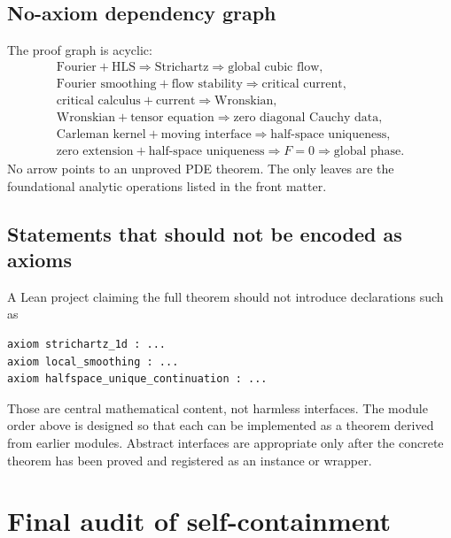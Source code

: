 \documentclass[11pt,oneside]{book}
\theoremstyle{definition}
\theoremstyle{remark}
\newcommand{\1}{\mathbf 1}
\begin{document}
\section{No-axiom dependency graph}
The proof graph is acyclic:
\[
\begin{gathered}
 \text{Fourier}+\text{HLS}
 \Longrightarrow \text{Strichartz}
 \Longrightarrow \text{global cubic flow},\\
 \text{Fourier smoothing}+\text{flow stability}
 \Longrightarrow \text{critical current},\\
 \text{critical calculus}+\text{current}
 \Longrightarrow \text{Wronskian},\\
 \text{Wronskian}+\text{tensor equation}
 \Longrightarrow \text{zero diagonal Cauchy data},\\
 \text{Carleman kernel}+\text{moving interface}
 \Longrightarrow \text{half-space uniqueness},\\
 \text{zero extension}+\text{half-space uniqueness}
 \Longrightarrow F=0
 \Longrightarrow \text{global phase}.
\end{gathered}
\]
No arrow points to an unproved PDE theorem.  The only leaves are the
foundational analytic operations listed in the front matter.

\section{Statements that should not be encoded as axioms}
A Lean project claiming the full theorem should not introduce declarations
such as
\begin{verbatim}
axiom strichartz_1d : ...
axiom local_smoothing : ...
axiom halfspace_unique_continuation : ...
\end{verbatim}
Those are central mathematical content, not harmless interfaces.  The module
order above is designed so that each can be implemented as a theorem derived
from earlier modules.  Abstract interfaces are appropriate only after the
concrete theorem has been proved and registered as an instance or wrapper.

\chapter{Final audit of self-containment}\label{app:audit}
\end{document}
